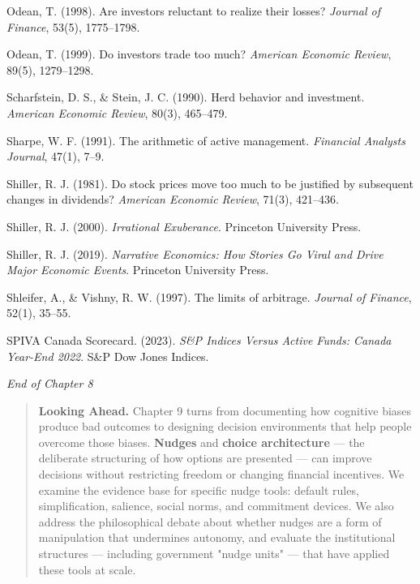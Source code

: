 \documentclass[12pt, letterpaper]{article}
\begin{document}
Odean, T. (1998). Are investors reluctant to realize their losses? \textit{Journal of Finance}, 53(5), 1775--1798.

Odean, T. (1999). Do investors trade too much? \textit{American Economic Review}, 89(5), 1279--1298.

Scharfstein, D. S., \& Stein, J. C. (1990). Herd behavior and investment. \textit{American Economic Review}, 80(3), 465--479.

Sharpe, W. F. (1991). The arithmetic of active management. \textit{Financial Analysts Journal}, 47(1), 7--9.

Shiller, R. J. (1981). Do stock prices move too much to be justified by subsequent changes in dividends? \textit{American Economic Review}, 71(3), 421--436.

Shiller, R. J. (2000). \textit{Irrational Exuberance}. Princeton University Press.

Shiller, R. J. (2019). \textit{Narrative Economics: How Stories Go Viral and Drive Major Economic Events}. Princeton University Press.

Shleifer, A., \& Vishny, R. W. (1997). The limits of arbitrage. \textit{Journal of Finance}, 52(1), 35--55.

SPIVA Canada Scorecard. (2023). \textit{S\&P Indices Versus Active Funds: Canada Year-End 2022}. S\&P Dow Jones Indices.

\medskip

\textit{End of Chapter 8}

\medskip

\begin{quote}
\textbf{Looking Ahead.} Chapter 9 turns from documenting how cognitive biases produce bad outcomes to designing decision environments that help people overcome those biases. \textbf{Nudges} and \textbf{choice architecture} --- the deliberate structuring of how options are presented --- can improve decisions without restricting freedom or changing financial incentives. We examine the evidence base for specific nudge tools: default rules, simplification, salience, social norms, and commitment devices. We also address the philosophical debate about whether nudges are a form of manipulation that undermines autonomy, and evaluate the institutional structures --- including government "nudge units" --- that have applied these tools at scale.
\end{quote}
\end{document}
